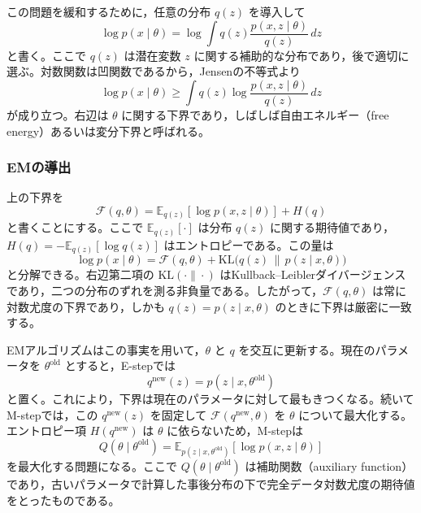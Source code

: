 この問題を緩和するために，任意の分布 \(q(z)\) を導入して
\begin{equation}
\log p(x \mid \theta)
= \log \int q(z)\frac{p(x,z \mid \theta)}{q(z)}\, dz
\end{equation}
と書く。ここで \(q(z)\) は潜在変数 \(z\) に関する補助的な分布であり，後で適切に選ぶ。対数関数は凹関数であるから，Jensenの不等式より
\begin{equation}
\log p(x \mid \theta)
\ge
\int q(z)\log \frac{p(x,z \mid \theta)}{q(z)}\, dz
\end{equation}
が成り立つ。右辺は \(\theta\) に関する下界であり，しばしば自由エネルギー（free energy）あるいは変分下界と呼ばれる。

\subsubsection{EMの導出}

上の下界を
\begin{equation}
\mathcal{F}(q,\theta)
=
\mathbb{E}_{q(z)}[\log p(x,z \mid \theta)] + H(q)
\end{equation}
と書くことにする。ここで \(\mathbb{E}_{q(z)}[\cdot]\) は分布 \(q(z)\) に関する期待値であり，\(H(q)=-\mathbb{E}_{q(z)}[\log q(z)]\) はエントロピーである。この量は
\begin{equation}
\log p(x \mid \theta)
=
\mathcal{F}(q,\theta)
+
\mathrm{KL}\bigl(q(z)\,\|\,p(z \mid x,\theta)\bigr)
\end{equation}
と分解できる。右辺第二項の \(\mathrm{KL}(\cdot\|\cdot)\) はKullback--Leiblerダイバージェンスであり，二つの分布のずれを測る非負量である。したがって，\(\mathcal{F}(q,\theta)\) は常に対数尤度の下界であり，しかも \(q(z)=p(z \mid x,\theta)\) のときに下界は厳密に一致する。

EMアルゴリズムはこの事実を用いて，\(\theta\) と \(q\) を交互に更新する。現在のパラメータを \(\theta^{\text{old}}\) とすると，E-stepでは
\begin{equation}
q^{\text{new}}(z)=p(z \mid x,\theta^{\text{old}})
\end{equation}
と置く。これにより，下界は現在のパラメータに対して最もきつくなる。続いてM-stepでは，この \(q^{\text{new}}(z)\) を固定して \(\mathcal{F}(q^{\text{new}},\theta)\) を \(\theta\) について最大化する。エントロピー項 \(H(q^{\text{new}})\) は \(\theta\) に依らないため，M-stepは
\begin{equation}
Q(\theta \mid \theta^{\text{old}})
=
\mathbb{E}_{p(z \mid x,\theta^{\text{old}})}[\log p(x,z \mid \theta)]
\end{equation}
を最大化する問題になる。ここで \(Q(\theta \mid \theta^{\text{old}})\) は補助関数（auxiliary function）であり，古いパラメータで計算した事後分布の下で完全データ対数尤度の期待値をとったものである。

